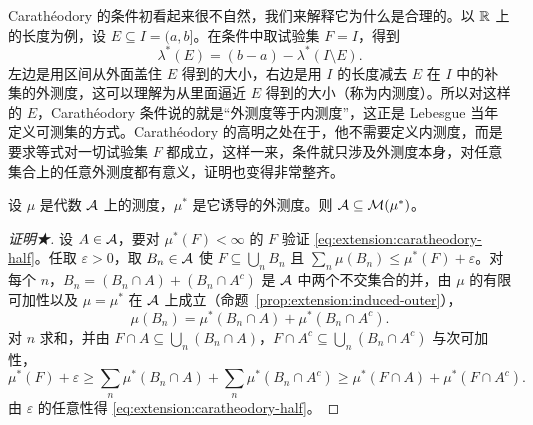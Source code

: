 \begin{remark}
Carathéodory 的条件初看起来很不自然，我们来解释它为什么是合理的。以 $\mathbb{R}$ 上的长度为例，设 $E\subseteq I=(a,b]$。在条件中取试验集 $F=I$，得到
\[
\lambda^*(E)=(b-a)-\lambda^*(I\setminus E).
\]
左边是用区间从外面盖住 $E$ 得到的大小，右边是用 $I$ 的长度减去 $E$ 在 $I$ 中的补集的外测度，这可以理解为从里面逼近 $E$ 得到的大小（称为内测度）。所以对这样的 $E$，Carathéodory 条件说的就是“外测度等于内测度”，这正是 Lebesgue 当年定义可测集的方式。Carathéodory 的高明之处在于，他不需要定义内测度，而是要求等式对一切试验集 $F$ 都成立，这样一来，条件就只涉及外测度本身，对任意集合上的任意外测度都有意义，证明也变得非常整齐。
\end{remark}

\begin{lemma}\label{lem:extension:algebra-measurable}
设 $\mu$ 是代数 $\mathcal{A}$ 上的测度，$\mu^*$ 是它诱导的外测度。则 $\mathcal{A}\subseteq\mathcal{M}(\mu^*)$。
\end{lemma}
\begin{proof}[证明★]
设 $A\in\mathcal{A}$，要对 $\mu^*(F)<\infty$ 的 $F$ 验证 \eqref{eq:extension:caratheodory-half}。任取 $\varepsilon>0$，取 $B_n\in\mathcal{A}$ 使 $F\subseteq\bigcup_nB_n$ 且 $\sum_n\mu(B_n)\leqslant\mu^*(F)+\varepsilon$。对每个 $n$，$B_n=(B_n\cap A)+(B_n\cap A^c)$ 是 $\mathcal{A}$ 中两个不交集合的并，由 $\mu$ 的有限可加性以及 $\mu=\mu^*$ 在 $\mathcal{A}$ 上成立（命题~\ref{prop:extension:induced-outer}），
\[
\mu(B_n)=\mu^*(B_n\cap A)+\mu^*(B_n\cap A^c).
\]
对 $n$ 求和，并由 $F\cap A\subseteq\bigcup_n(B_n\cap A)$，$F\cap A^c\subseteq\bigcup_n(B_n\cap A^c)$ 与次可加性，
\[
\mu^*(F)+\varepsilon\geqslant\sum_n\mu^*(B_n\cap A)+\sum_n\mu^*(B_n\cap A^c)\geqslant\mu^*(F\cap A)+\mu^*(F\cap A^c).
\]
由 $\varepsilon$ 的任意性得 \eqref{eq:extension:caratheodory-half}。
\end{proof}



